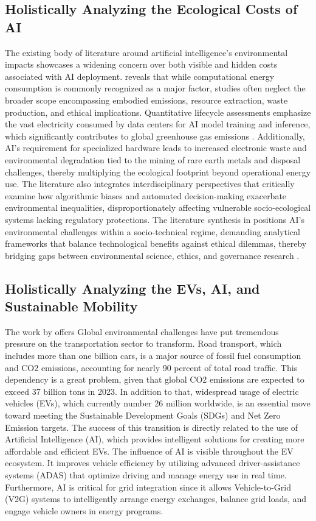\documentclass[a4paper, 12pt]{article}
\begin{document}
\subsection{Holistically Analyzing the Ecological Costs of AI}
The existing body of literature around artificial intelligence's environmental impacts showcases a widening concern over both visible and hidden costs associated with AI deployment. \citet{Zhuk2023} reveals that while computational energy consumption is commonly recognized as a major factor, studies often neglect the broader scope encompassing embodied emissions, resource extraction, waste production, and ethical implications. Quantitative lifecycle assessments emphasize the vast electricity consumed by data centers for AI model training and inference, which significantly contributes to global greenhouse gas emissions \citep{Zhuk2023}. Additionally, AI's requirement for specialized hardware leads to increased electronic waste and environmental degradation tied to the mining of rare earth metals and disposal challenges, thereby multiplying the ecological footprint beyond operational energy use. The literature also integrates interdisciplinary perspectives that critically examine how algorithmic biases and automated decision-making exacerbate environmental inequalities, disproportionately affecting vulnerable socio-ecological systems lacking regulatory protections. The literature synthesis in \citet{Zhuk2023} positions AI's environmental challenges within a socio-technical regime, demanding analytical frameworks that balance technological benefits against ethical dilemmas, thereby bridging gaps between environmental science, ethics, and governance research \citep[p.~935--940]{Zhuk2023}.
\subsection{Holistically Analyzing the EVs, AI, and Sustainable Mobility}
The work by \citet{M.rauf2024} offers Global environmental challenges have put tremendous pressure on the transportation sector to transform.  Road transport, which includes more than one billion cars, is a major source of fossil fuel consumption and CO2 emissions, accounting for nearly 90 percent of total road traffic. This dependency is a great problem, given that global CO2 emissions are expected to exceed 37 billion tons in 2023. In addition to that, widespread usage of electric vehicles (EVs), which currently number 26 million worldwide, is an essential move toward meeting the Sustainable Development Goals (SDGs) and Net Zero Emission targets.  The success of this transition is directly related to the use of Artificial Intelligence (AI), which provides intelligent solutions for creating more affordable and efficient EVs. The influence of AI is visible throughout the EV ecosystem. It improves vehicle efficiency by utilizing advanced driver-assistance systems (ADAS) that optimize driving and manage energy use in real time.  Furthermore, AI is critical for grid integration since it allows Vehicle-to-Grid (V2G) systems to intelligently arrange energy exchanges, balance grid loads, and engage vehicle owners in energy programs.
\end{document}
